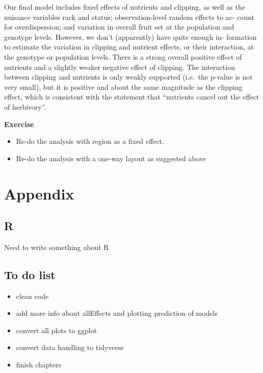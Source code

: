 \documentclass[
  12pt,
]{book}
\providecommand{\tightlist}{%
  \setlength{\itemsep}{0pt}\setlength{\parskip}{0pt}}
\begin{document}
Our final model includes fixed effects of nutrients and clipping, as well as the nuisance variables rack and status; observation-level random effects to ac- count for overdispersion; and variation in overall fruit set at the population and genotype levels. However, we don't (apparently) have quite enough in- formation to estimate the variation in clipping and nutrient effects, or their interaction, at the genotype or population levels. There is a strong overall positive effect of nutrients and a slightly weaker negative effect of clipping. The interaction between clipping and nutrients is only weakly supported (i.e.~the p-value is not very small), but it is positive and about the same magnitude as the clipping effect, which is consistent with the statement that ``nutrients cancel out the effect of herbivory''.

\textbf{Exercise}

\begin{itemize}
\tightlist
\item
  Re-do the analysis with region as a fixed effect.
\item
  Re-do the analysis with a one-way layout as suggested above
\end{itemize}

\hypertarget{part-appendix}{%
\part{Appendix}\label{part-appendix}}

\hypertarget{r-1}{%
\chapter*{R}\label{r-1}}

Need to write something about R

\hypertarget{to-do-list}{%
\chapter*{To do list}\label{to-do-list}}

\begin{itemize}
\tightlist
\item
  clean code
\item
  add more info about allEffects and plotting prediction of models
\item
  convert all plots to ggplot
\item
  convert data handling to tidyverse
\item
  finish chapters
\end{itemize}

  

\printindex
\end{document}

